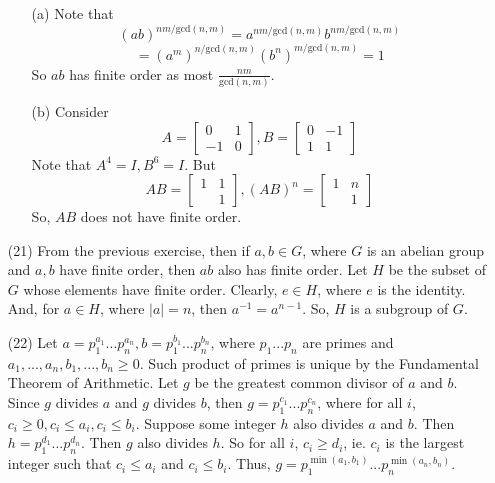 \begin{itemize}
\begin{itemize}
\item[(a)]
Note that 
$$(ab)^{nm/\text{gcd}(n,m)} = a^{nm/\text{gcd}(n,m)}b^{nm/\text{gcd}(n,m)}$$
$$= (a^m)^{n/\text{gcd}(n,m)}(b^n)^{m/\text{gcd}(n,m)} = 1$$ So $ab$ has finite order as most $\frac{nm}{\text{gcd}(n,m)}$. 
\item[(b)]
Consider
$$A = \begin{bmatrix}
0 & 1 \\
-1 & 0
\end{bmatrix}, B = \begin{bmatrix}
0 & -1 \\
1 & 1
\end{bmatrix}$$
Note that $A^4 = I, B^6 = I$. But
$$AB = \begin{bmatrix}
1 & 1 \\
& 1
\end{bmatrix}, (AB)^n = \begin{bmatrix}
1 & n \\
& 1
\end{bmatrix}$$
So, $AB$ does not have finite order.
\end{itemize}
\item[(21)]
From the previous exercise, then if $a, b \in G$, where $G$ is an abelian group and $a, b$ have finite order, then $ab$ also has finite order. Let $H$ be the subset of $G$ whose elements have finite order. Clearly, $e \in H$, where $e$ is the identity. And, for $a \in H$, where $|a| = n$, then $a^{-1} = a^{n-1}$. So, $H$ is a subgroup of $G$.
\item[(22)]
Let $a = p_1^{a_1}...p_n^{a_n}, b = p_1^{b_1}...p_n^{b_n}$, where $p_1...p_n$ are primes and $a_1, ..., a_n, b_1, ..., b_n \geq 0$. Such product of primes is unique by the Fundamental Theorem of Arithmetic. Let $g$ be the greatest common divisor of $a$ and $b$. Since $g$ divides $a$ and $g$ divides $b$, then $g = p_1^{c_1}...p_n^{c_n}$, where for all $i$, $c_i \geq 0, c_i \leq a_i, c_i \leq b_i$. Suppose some integer $h$ also divides $a$ and $b$. Then $h = p_1^{d_1}...p_n^{d_n}$. Then $g$ also divides $h$. So for all $i$, $c_i \geq d_i$, ie. $c_i$ is the largest integer such that $c_i \leq a_i$ and $c_i \leq b_i$. Thus, $g = p_1^{\min(a_1,b_1)}...p_n^{\min(a_n,b_n)}$.
\end{itemize}
%